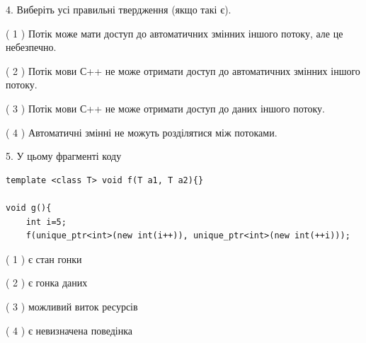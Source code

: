 \documentclass[12pt, ukrainian]{article}
\begin{document}
\begin {large}
{%
4. Виберіть усі правильні твердження (якщо такі є).\par
\vspace{2mm}

( 1 ) Потік може мати доступ до автоматичних змінних іншого потоку, але це небезпечно.%

( 2 ) Потік мови С++ не може отримати доступ до автоматичних змінних іншого потоку.%

( 3 ) Потік мови С++ не може отримати доступ до даних іншого потоку.%

( 4 ) Автоматичні змінні не можуть розділятися між потоками.%


5. У цьому фрагменті коду
\begin{verbatim}
template <class T> void f(T a1, T a2){}

void g(){
    int i=5;
    f(unique_ptr<int>(new int(i++)), unique_ptr<int>(new int(++i)));
\end{verbatim}

( 1 ) є стан гонки%

( 2 ) є гонка даних%

( 3 ) можливий виток ресурсів%

( 4 ) є невизначена поведінка%
}
\end {large}
\end{document}
